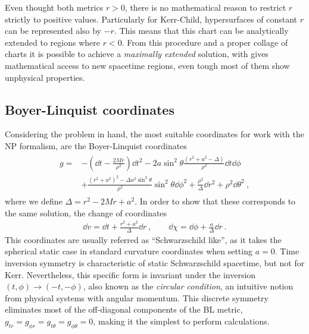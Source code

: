 Even thought both metrics $r>0$, there is no mathematical reason to restrict $r$ strictly to positive values.
Particularly for Kerr-Child, hypersurfaces of constant $r$ can be represented also by $-r$. 
This means that this chart can be analytically extended to regions where $r<0$.
From this procedure and a proper collage of charts it is possible to achieve a \emph{maximally extended} solution, with gives mathematical access to new spacetime regions, even tough most of them show unphysical properties.


\subsection{Boyer-Linquist coordinates}

Considering the problem in hand, the most suitable coordinates for work with the NP formalism, are the Boyer-Linquist coordinates
\begin{align}
    \begin{split}
        g = &- \left(\dd t - \frac{2 M r}{\rho^2} \right) \dd t^2 - 2 a \sin^2\theta \frac{(r^2+a^2-\Delta)}{\rho^2} \dd t \dd \phi \\
        &+ \frac{(r^2+a^2)^2- \Delta a^2 \sin^2\theta}{\rho^2} \sin^2\theta \dd\phi^2 + \frac{\rho^2}{\Delta} \dd r^2 + \rho^2 \dd \theta^2 ~,
    \end{split}
    \label{eq2:KerrBL}
\end{align}
where we define $\Delta=r^2-2 M r + a^2$. In order to show that these corresponds to the same solution, the change of coordinates
\begin{align}
    \dd v= \dd t + \frac{r^2+a^2}{\Delta} \dd r ~, \qquad \dd\chi = \dd\phi + \frac{a}{\Delta} \dd r ~.
    \label{eq2:InEFtoBL}
\end{align}
This coordinates are usually referred as ``Schwarzschild like'', as it takes the spherical static case in standard curvature coordinates when setting $a=0$. 
Time inversion symmetry is characteristic of static Schwarzschild spacetime, but not for Kerr.
Nevertheless, this specific form is invariant under the inversion $(t,\phi)\to(-t,-\phi)$, also known as the \emph{circular condition}, an intuitive notion from physical systems with angular momentum.
This discrete symmetry eliminates most of the off-diagonal components of the BL metric, $g_{tr} = g_{\phi r} = g_{t \theta} = g_{\phi \theta} = 0$, making it the simplest to perform calculations.


